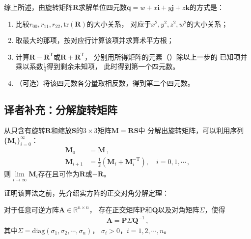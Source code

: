 综上所述，由旋转矩阵$\bm R$求解单位四元数$\bm q=w+x\mathbf{i}+y\mathbf{j}+z\mathbf{k}$的方式是：
\begin{enumerate}
    \item 比较$r_{00},r_{11},r_{22},\mathrm{tr}(\bm R)$的大小关系，
          对应于$x^2,y^2,z^2,w^2$的大小关系；
    \item 取最大的那项，按对应行计算该项并求算术平方根；
    \item 计算$\bm R-\bm R^\mathrm{T}$或$\bm R+\bm R^\mathrm{T}$，
          分别用所得矩阵的元素（）除以上一步的
          已知项并乘以系数$\displaystyle\frac{1}{4}$得到剩余未知项，
          此时得到第一个四元数。
    \item （可选）将该四元数各分量取相反数，得到第二个四元数。
\end{enumerate}

\subsection{译者补充：分解旋转矩阵}\label{sub:译者补充：分解旋转矩阵}
从只含有旋转$\bm R$和缩放$\bm S$的$3\times3$矩阵$\bm M=\bm R\bm S$中
分解出旋转矩阵，可以利用序列$\displaystyle\{\bm M_i\}_{i=0}^{\infty}$：
\begin{align}
    \bm M_0     & =\bm M\, ,                                                         \\
    \bm M_{i+1} & =\frac{1}{2}(\bm M_i+\bm M_i^{-\mathrm{T}}),\quad i=0,1,\cdots\, ,
\end{align}
则$\displaystyle \lim\limits_{i \to \infty}{\bm M_i}$存在且可作为$\bm R$或$-\bm R$。

证明该算法之前，先介绍实方阵的正交对角分解定理：
\begin{theorem}
    对于任意可逆方阵$\bm A\in\mathbb{R}^{n\times n}$，
    存在正交矩阵$\bm P$和$\bm Q$以及对角矩阵$\bm \varSigma$，使得
    \begin{align}
        \bm A=\bm P\bm \varSigma\bm Q^{-1}\, ,
    \end{align}
    其中$\bm \varSigma=\mathrm{diag}(\sigma_1,\sigma_2,\cdots,\sigma_n)$，
    $\sigma_i>0$，$i=1,2,\cdots,n$。
\end{theorem}


